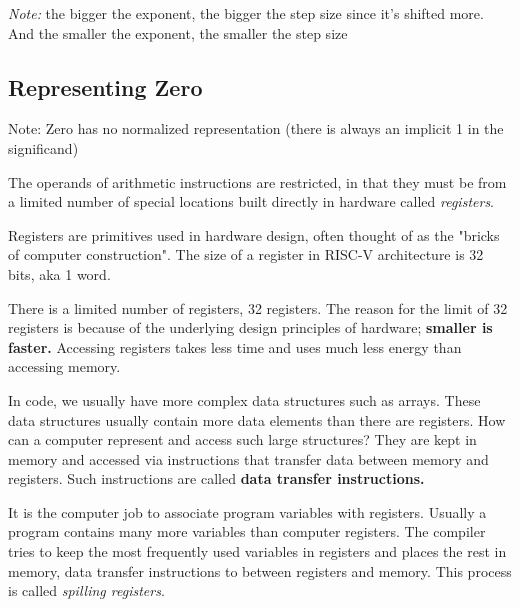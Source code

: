\documentclass[12pt]{article}
\begin{document}
\emph{Note:} the bigger the exponent, the bigger the step size since it's shifted more.
And the smaller the exponent, the smaller the step size


\subsection*{Representing Zero}
Note: Zero has no normalized representation (there is always an implicit 1 in the significand)



The operands of arithmetic instructions are restricted, in that they must be from a limited number of special locations built directly in hardware called \emph{registers}.
\begin{definition}[Registers]
    Registers are primitives used in hardware design, often thought of as the "bricks of computer construction". The size of a register in RISC-V architecture is 32 bits, aka 1 word.

    There is a limited number of registers, 32 registers. The reason for the limit of 32 registers is because of the underlying design principles of hardware; \textbf{smaller is faster.} Accessing registers takes less time and uses much less energy than accessing memory.


\end{definition}

In code, we usually have more complex data structures such as arrays. These data structures usually contain more data elements than there are registers. How can a computer represent and access such large structures? They are kept in memory and accessed via instructions that transfer data between memory and registers. Such instructions are called \textbf{data transfer instructions.}

It is the computer job to associate program variables with registers. Usually a program contains many more variables than computer registers. The compiler tries to keep the most frequently used variables in registers and places the rest in memory, data transfer instructions to between registers and memory. This process is called \emph{spilling registers}.


\end{document}
